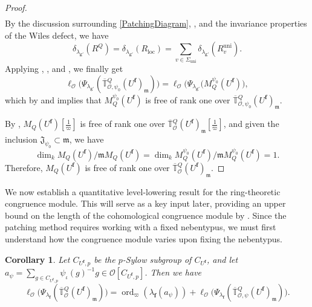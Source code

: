 \documentclass[a4paper, notitlepage, 10pt]{amsart}
\theoremstyle{plain} %
\newtheorem{corollary}[theorem]{Corollary}
\theoremstyle{definition} %
\theoremstyle{remark} %
\numberwithin{equation}{section}
\newcommand{\ord}{\operatorname{ord}} %
\newcommand{\uni}{\operatorname{uni}}
\begin{document}
\begin{proof}
\begin{align*}
\end{align*}
By the discussion surrounding \eqref{PatchingDiagram}, , and the invariance properties  of the Wiles defect, we have
$$\delta_{\lambda_{\mathbf{g}'}}(R^Q)=\delta_{\lambda_{\mathbf{g}'}}(R_{\mathrm{loc}})=\sum_{v\in \Sigma_{\uni}}\delta_{\lambda_{\mathbf{g}'}}(R_v^{\uni}).$$
Applying , , and , we finally get 
$$ \ell_{\mathcal{O}}\big(\Psi_{\lambda_{\mathbf{g}'}}(\overline{\mathbb{T}}{}^{Q}_{\mathcal{O},\psi_0}(U^{\mathbf{f}})_{\mathfrak{m}})\big)= \ell_{\mathcal{O}}\big(\Psi_{\lambda_{\mathbf{g'}}}(M^{\psi_0}_Q(U^{\mathbf{f}})\big),$$
which by  and  implies that $M^{\psi_0}_Q(U^{\mathbf{f}})$ is free of rank one over $\overline{\mathbb{T}}{}^{Q}_{\mathcal{O},\psi_0}(U^{\mathbf{f}})_{\mathfrak{m}}$.

By ,  $M_Q(U^{\mathbf{f}})[\tfrac{1}{\varpi}]$ is free of rank one over $\overline{\mathbb{T}}{}^{Q}_{\mathcal{O}}(U^{\mathbf{f}})_{\mathfrak{m}}[\tfrac{1}{\varpi}]$, and given the inclusion $\mathfrak{J}_{\psi_0}\subset \mathfrak{m}$, we have
\begin{equation*}
    \dim_k M_Q(U^{\mathbf{f}})/\mathfrak{m}M_Q(U^{\mathbf{f}})=\dim_k M_Q^{\psi_0}(U^{\mathbf{f}})/\mathfrak{m}M_Q^{\psi_0}(U^{\mathbf{f}})=1.
\end{equation*}
Therefore, $M_Q(U^{\mathbf{f}})$ is free of rank one over $\overline{\mathbb{T}}{}^{Q}_{\mathcal{O}}(U^{\mathbf{f}})_{\mathfrak{m}}$.
 \end{proof}
We now establish a quantitative level-lowering result for the ring-theoretic congruence module. This will serve as a key input later, providing an upper bound on the length of the cohomological congruence module by . Since the patching method requires working with a fixed nebentypus, we must first understand how the congruence module varies upon fixing the nebentypus.
\begin{corollary}\label{congmodule+/-nebentypus}
      Let $C_{U^{\mathbf{f}},p}$ be the $p$-Sylow subgroup of $C_{U^{\mathbf{f}}}$, and let $a_{\psi}= \sum_{g\in C_{U^{\mathbf{f}},p}} \psi_{\iota}(g)^{-1}g \in \mathcal{O}[C_{U^{\mathbf{f}},p}]$. Then we have 
    $$ \ell_{\mathcal{O}}\big(\Psi_{\lambda_{\mathbf{f}}}(\overline{\mathbb{T}}{}^{Q}_{\mathcal{O}}(U^{\mathbf{f}})_{\mathfrak{m}})\big)=\ord_{\varpi}(\lambda_{\mathbf{f}}(a_\psi))+\ell_{\mathcal{O}}\big(\Psi_{\lambda_{\mathbf{f}}}(\overline{\mathbb{T}}{}^{Q}_{\mathcal{O},\psi}(U^{\mathbf{f}})_{\mathfrak{m}})\big). $$
\end{corollary}
\end{document}
